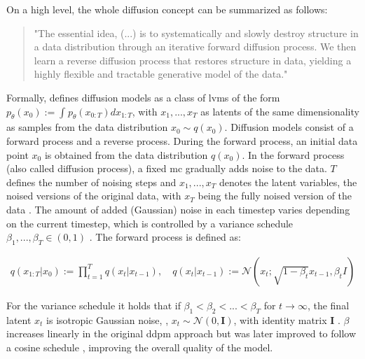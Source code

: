 On a high level, the whole diffusion concept can be summarized as follows:

\begin{quotation}
  "The essential idea, (...) is to systematically and slowly destroy structure in a data distribution through an iterative forward diffusion process. 
  We then learn a reverse diffusion process that restores structure in data, yielding a highly flexible and tractable generative model of the data." \cite[p. 1]{sohl-dickstein2015DeepUnsupervisedLearning}
\end{quotation}

Formally, \cite{ho2020DenoisingDiffusionProbabilistic} defines diffusion models as a class of \glspl{lvm} of the form $p_\theta(x_0):= \int_{}^{}p_\theta(x_{0:T})dx_{1:T}$,
with $x_1, ..., x_T$ as latents of the same dimensionality as samples from the data distribution $x_0 \sim q(x_0)$.
Diffusion models consist of a forward process and a reverse process.
During the forward process, an initial data point $x_0$ is obtained from the data distribution $q(x_0)$.
In the forward process (also called diffusion process), a fixed \gls{mc} gradually adds noise to the data.
$T$ defines the number of noising steps and $x_1,...,x_T$ denotes the latent variables, \ie the noised versions of the original data, with $x_T$ being the fully noised version of the data \cite{ho2020DenoisingDiffusionProbabilistic}.
The amount of added (Gaussian) noise in each timestep varies depending on the current timestep, which is controlled by a variance schedule $\beta_1, ..., \beta_T \in (0,1)$ \cite{ho2020DenoisingDiffusionProbabilistic}.
The forward process is defined as:

\begin{equation}
  \label{eqn:forwards_1}
  \begin{align*}
    q(x_{1:T} | x_0) := \prod_{t=1}^T q(x_t | x_{t-1}), \quad
    q(x_t | x_{t-1}) := \mathcal{N}(x_t; \sqrt{1 - \beta_t} x_{t-1}, \beta_t I)
  \end{align*}
\end{equation}

For the variance schedule it holds that if $\beta_1 < \beta_2 < ... < \beta_T$ for $t\rightarrow\infty$, the final latent $x_t$ is isotropic Gaussian noise, \ie, $x_t \sim \mathcal{N}(0, \textbf{I})$, with identity matrix $\textbf{I}$ \cite{zbinden2022ImplementingExperimentingDiffusion}.
$\beta$ increases linearly in the original \gls{ddpm} approach \cite{ho2020DenoisingDiffusionProbabilistic} but was later improved to follow a cosine schedule \cite{nichol2021ImprovedDenoisingDiffusion}, improving the overall quality of the model.

